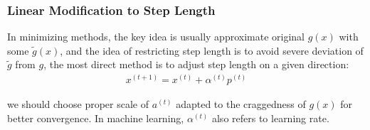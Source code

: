    \subsubsection{Linear Modification to Step Length}

    In minimizing methods, the key idea is usually approximate original $ g(x) $ with some $ \tilde{g}(x) $, and the idea of restricting step length is to avoid severe deviation of $ \tilde{g} $ from $ g $, the most direct method is to adjust step length on a given direction: 
    \begin{align}
        x^{(t+1)}=x^{(t)}+\alpha ^{(t)}p^{(t)}
    \end{align}
    
    we should choose proper scale of $ a^{(t)} $ adapted to the craggedness of $ g(x) $ for better convergence. In machine learning, $ \alpha ^{(t)} $ also refers to learning rate.
